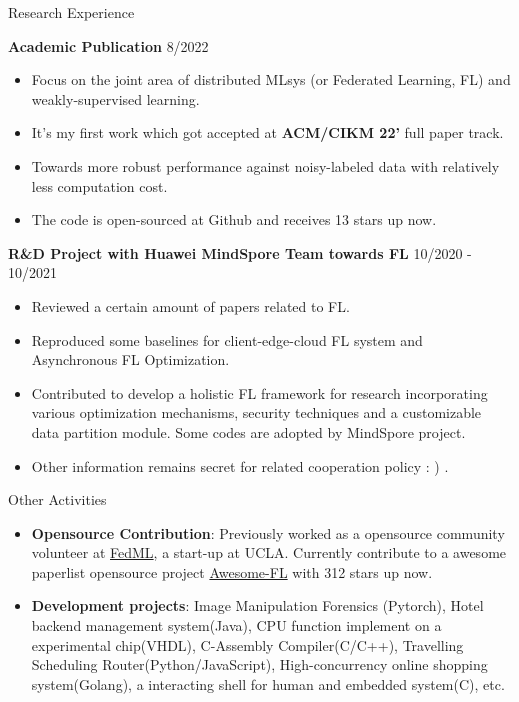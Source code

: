 \documentclass{resume} %
\begin{document}
\begin{CJK}{UTF8}{gbsn}
\begin{rSection}{Research Experience}
\vspace{-1.25em}
\item \textbf{Academic Publication} \hfill {8/2022}
\begin{itemize}
    \itemsep -3pt {} 
     \item Focus on the joint area of distributed MLsys (or Federated Learning, FL) and weakly-supervised learning.
     \item It's my first work which got accepted at \textbf{ACM/CIKM 22'} full paper track.
     \item Towards more robust performance against noisy-labeled data with relatively less computation cost.
    \item The code is open-sourced at Github and receives 13 stars up now.
 \end{itemize}
\item \textbf{R\&D Project with Huawei MindSpore Team towards FL}  \hfill {10/2020 - 10/2021}
\begin{itemize}
    \itemsep -3pt {} 
     \item Reviewed a certain amount of papers related to FL.
     \item Reproduced some baselines for client-edge-cloud FL system and Asynchronous FL Optimization.
    \item Contributed to develop a holistic FL framework for research incorporating various optimization mechanisms, security techniques and a customizable data partition module. Some codes are adopted by MindSpore project.
    \item Other information remains secret for related cooperation policy : ) .
 \end{itemize}
\end{rSection} 

\begin{rSection}{Other Activities} 
\begin{itemize}
    \item 	\textbf{Opensource Contribution}: Previously worked as a opensource community volunteer at \href{https://fedml.ai/}{FedML}, a start-up at UCLA. Currently contribute to a awesome paperlist opensource project \href{https://github.com/youngfish42/Awesome-Federated-Learning-on-Graph-and-Tabular-Data}{Awesome-FL} with 312 stars up now.
    \item	\textbf{Development projects}: Image Manipulation Forensics (Pytorch), Hotel backend management system(Java), CPU function implement on a experimental chip(VHDL), C-Assembly  Compiler(C/C++), Travelling Scheduling Router(Python/JavaScript), High-concurrency online shopping system(Golang), a interacting shell for human and embedded system(C), etc.
\end{itemize}



\end{rSection}
\end{CJK}
\end{document}
